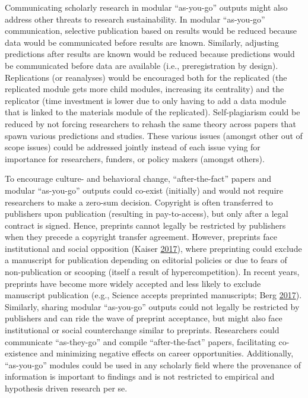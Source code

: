 \documentclass[a5paper]{book}
\begin{document}
Communicating scholarly research in modular \enquote{as-you-go} outputs
might also address other threats to research sustainability. In modular
\enquote{as-you-go} communication, selective publication based on
results would be reduced because data would be communicated before
results are known. Similarly, adjusting predictions after results are
known would be reduced because predictions would be communicated before
data are available (i.e., preregistration by design). Replications (or
reanalyses) would be encouraged both for the replicated (the replicated
module gets more child modules, increasing its centrality) and the
replicator (time investment is lower due to only having to add a data
module that is linked to the materials module of the replicated).
Self-plagiarism could be reduced by not forcing researchers to rehash
the same theory across papers that spawn various predictions and
studies. These various issues (amongst other out of scope issues) could
be addressed jointly instead of each issue vying for importance for
researchers, funders, or policy makers (amongst others).

To encourage culture- and behavioral change, \enquote{after-the-fact}
papers and modular \enquote{as-you-go} outputs could co-exist
(initially) and would not require researchers to make a zero-sum
decision. Copyright is often transferred to publishers upon publication
(resulting in pay-to-access), but only after a legal contract is signed.
Hence, preprints cannot legally be restricted by publishers when they
precede a copyright transfer agreement. However, preprints face
institutional and social opposition (Kaiser
\protect\hyperlink{ref-doi:10.1126ux2fscience.aaq0747}{2017}), where
preprinting could exclude a manuscript for publication depending on
editorial policies or due to fears of non-publication or scooping
(itself a result of hypercompetition). In recent years, preprints have
become more widely accepted and less likely to exclude manuscript
publication (e.g., Science accepts preprinted manuscripts; Berg
\protect\hyperlink{ref-doi:10.1126ux2fscience.aaq0167}{2017}).
Similarly, sharing modular \enquote{as-you-go} outputs could not legally
be restricted by publishers and can ride the wave of preprint
acceptance, but might also face institutional or social counterchange
similar to preprints. Researchers could communicate \enquote{as-they-go}
and compile \enquote{after-the-fact} papers, facilitating co-existence
and minimizing negative effects on career opportunities. Additionally,
\enquote{as-you-go} modules could be used in any scholarly field where
the provenance of information is important to findings and is not
restricted to empirical and hypothesis driven research per se.
\end{document}
